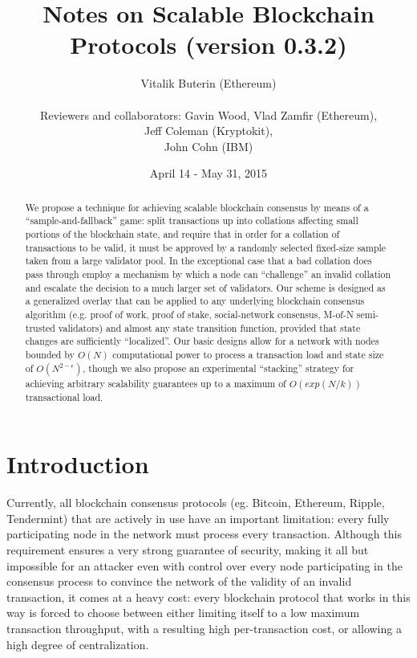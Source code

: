 \documentclass[11pt,a4paper]{article}
\makeatletter
\theoremstyle{plain}
\theoremstyle{definition}
\theoremstyle{remark}
\newcommand{\eg}{e.g.\@\xspace}
\makeatother
\begin{document}
\title{Notes on Scalable Blockchain Protocols (version 0.3.2)}
\date{April 14 - May 31, 2015}
\author{Vitalik Buterin (Ethereum) \\  \\ Reviewers and collaborators: Gavin Wood, Vlad Zamfir (Ethereum), \\ Jeff Coleman (Kryptokit), \\ John Cohn (IBM)}

\maketitle

\begin{abstract}
We propose a technique for achieving scalable blockchain consensus by means of a ``sample-and-fallback'' game: split transactions up into collations affecting small portions of the blockchain state, and require that in order for a collation of transactions to be valid, it must be approved by a randomly selected fixed-size sample taken from a large validator pool. In the exceptional case that a bad collation does pass through employ a mechanism by which a node can ``challenge'' an invalid collation and escalate the decision to a much larger set of validators. Our scheme is designed as a generalized overlay that can be applied to any underlying blockchain consensus algorithm (\eg proof of work, proof of stake, social-network consensus, M-of-N semi-trusted validators) and almost any state transition function, provided that state changes are sufficiently ``localized''. Our basic designs allow for a network with nodes bounded by $O(N)$ computational power to process a transaction load and state size of $O(N^{2-\epsilon})$, though we also propose an experimental ``stacking'' strategy for achieving arbitrary scalability guarantees up to a maximum of $O(exp(N/k))$ transactional load.
\end{abstract}

\section{Introduction}

Currently, all blockchain consensus protocols (eg. Bitcoin, Ethereum, Ripple, Tendermint) that are actively in use have an important limitation: every fully participating node in the network must process every transaction. Although this requirement ensures a very strong guarantee of security, making it all but impossible for an attacker even with control over every node participating in the consensus process to convince the network of the validity of an invalid transaction, it comes at a heavy cost: every blockchain protocol that works in this way is forced to choose between either limiting itself to a low maximum transaction throughput, with a resulting high per-transaction cost, or allowing a high degree of centralization.
\end{document}
